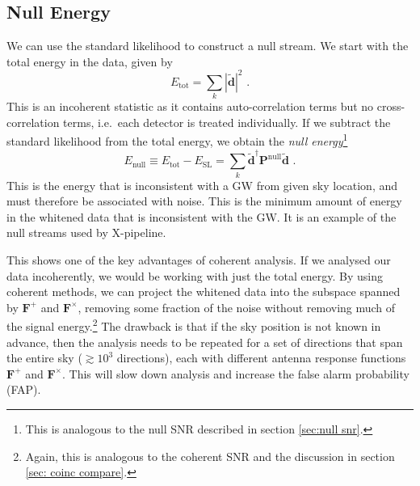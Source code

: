 \documentclass[11pt]{cuthesis}
\newcommand{\fs}{\text{ .}}
\newcommand{\tbd}{\tilde{\textbf{d}}}
\begin{document}
\subsection{Null Energy}
We can use the standard likelihood to construct a null stream. We start with the total energy in the data, given by
\begin{equation}
E_\text{tot}=\sum_k | \tbd |^2 \fs
\end{equation}
This is an incoherent statistic as it contains auto-correlation terms but no cross-correlation terms, i.e.~each detector is treated individually. If we subtract the standard likelihood from the total energy, we obtain the \emph{null energy}\footnote{This is analogous to the null SNR described in section \ref{sec:null snr}.}
\begin{equation} \label{Enull}
E_\text{null} \equiv E_\text{tot}-E_\text{SL}=\sum_k \tbd ^\dagger \textbf{P}^\text{null} \tbd \fs
\end{equation}
This is the energy that is inconsistent with a GW from given sky location, and must therefore be associated with noise. This is the minimum amount of energy in the whitened data that is inconsistent with the GW. It is an example of the null streams used by X-pipeline.

This shows one of the key advantages of coherent analysis. If we analysed our data incoherently, we would be working with just the total energy. By using coherent methods, we can project the whitened data into the subspace spanned by $\textbf{F}^+$ and $\textbf{F}^\times$, removing some fraction of the noise without removing much of the signal energy.\footnote{Again, this is analogous to the coherent SNR and the discussion in section \ref{sec: coinc compare}.} The drawback is that if the sky position is not known in advance, then the analysis needs to be repeated for a set of directions that span the entire sky ($\gtrsim 10^3$ directions), each with different antenna response functions $\textbf{F}^+$ and $\textbf{F}^\times$. This will slow down analysis and increase the false alarm probability (FAP).
\end{document}
